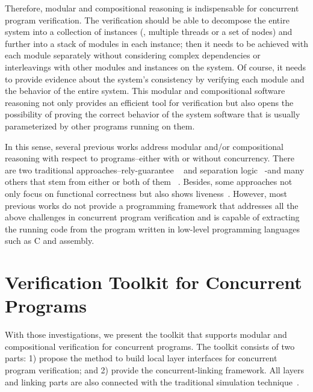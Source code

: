 
Therefore, modular and compositional reasoning is indispensable for concurrent program verification. 
The verification should be able to decompose the entire system into a collection of instances (\ie, multiple threads or a set of nodes) and 
further into a stack of modules in each instance; then it needs to be achieved with each module separately without considering complex 
dependencies or interleavings with other modules and instances on the system. Of course, it needs to provide evidence about the system's 
consistency by verifying each module and the behavior of the entire system. 
This modular and compositional software reasoning not only provides an efficient tool for verification 
but also opens the possibility of proving the correct behavior of the system software that is usually parameterized by other programs running on them.
%

In this sense, several previous works address modular and/or compositional reasoning with respect to programs--either with or without concurrency.
There are two traditional approaches--rely-guarantee ~\cite{jones83} and separation logic ~\cite{ishtiaq01}-and many others 
that stem from either or both of them 
~\cite{feng07:sagl,vafeiadis:marriage,LRG,fu10:roch,sergey15, lili16,Vafeiadis11mfps, Yang07relsep,
Liang14lics}.
Besides, some approaches not only focus on functional correctness but also shows liveness~\cite{lili16}.
However, most previous works do not provide a programming framework that addresses all the above challenges
in concurrent program verification and is capable of extracting the running code from the program written in low-level programming 
languages such as C and assembly.

\section{Verification Toolkit for Concurrent Programs}
\label{chapter:introduction:sec:verification-toolkit-for-concurrent-programs}
%
With those investigations, we present the toolkit that supports modular and compositional verification for concurrent programs. 
The toolkit consists of two parts: 1) propose the method to build local layer interfaces for concurrent program verification; and 
2) provide the concurrent-linking framework. All layers and linking parts are also connected with the traditional simulation 
technique~\cite{compcert, deepspec}. 
 
